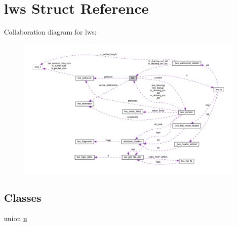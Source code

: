 \hypertarget{structlws}{}\section{lws Struct Reference}
\label{structlws}


Collaboration diagram for lws\+:
\nopagebreak
\begin{figure}[H]
\begin{center}
\leavevmode
\includegraphics[width=350pt]{structlws__coll__graph}
\end{center}
\end{figure}
\subsection*{Classes}
\begin{DoxyCompactItemize}
\item 
union \hyperlink{unionlws_1_1u}{u}
\end{DoxyCompactItemize}
